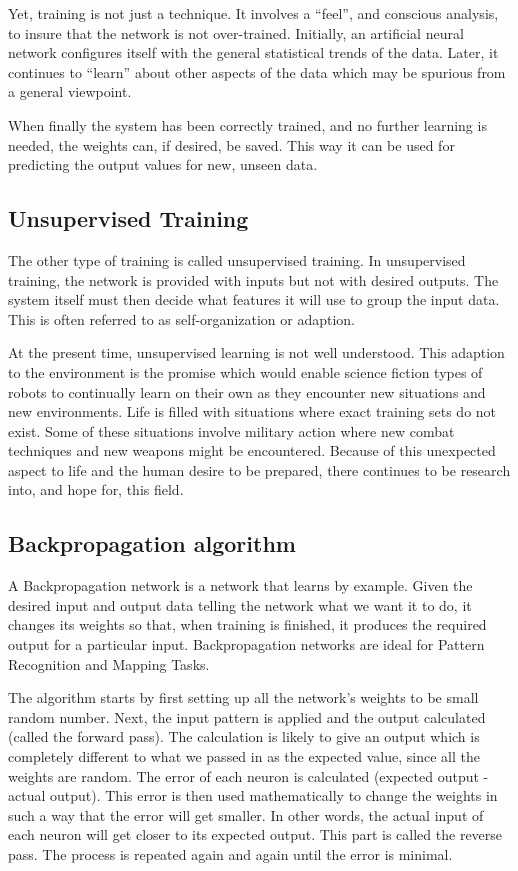 Yet, training is not just a technique. It involves a ``feel'', and conscious analysis, to insure that the network is not over-trained. Initially, an artificial neural network configures itself with the general statistical trends of the data. Later, it continues to ``learn'' about other aspects of the data which may be spurious from a general viewpoint.

When finally the system has been correctly trained, and no further learning is needed, the weights can, if desired, be saved. This way it can be used for predicting the output values for new, unseen data.

\vspace{10pt}
\subsection*{Unsupervised Training}

The other type of training is called unsupervised training. In unsupervised training, the network is provided with inputs but not with desired outputs. The system itself must then decide what features it will use to group the input data. This is often referred to as self-organization or adaption.

At the present time, unsupervised learning is not well understood. This adaption to the environment is the promise which would enable science fiction types of robots to continually learn on their own as they encounter new situations and new environments. Life is filled with situations where exact training sets do not exist. Some of these situations involve military action where new combat techniques and new weapons might be encountered. Because of this unexpected aspect to life and the human desire to be prepared, there continues to be research into, and hope for, this field.
\vspace{10pt}

\subsection{Backpropagation algorithm}

A Backpropagation network is a network that learns by example. Given the desired input and output data telling the network what we want it to do, it changes its weights so that, when training is finished, it produces the required output for a particular input. 
Backpropagation networks are ideal for Pattern Recognition and Mapping Tasks.

The algorithm starts by first setting up all the network's weights to be small random number. Next, the input pattern is applied and the output calculated (called the forward pass). The calculation is likely to give an output which is completely different to what we passed in as the expected value, since all the weights are random. The error of each neuron is calculated (expected output - actual output). This error is then used mathematically to change the weights in such a way that the error will get smaller. In other words, the actual input of each neuron will get closer to its expected output. This  part is called the reverse pass. The process is repeated again and again until the error is minimal.

